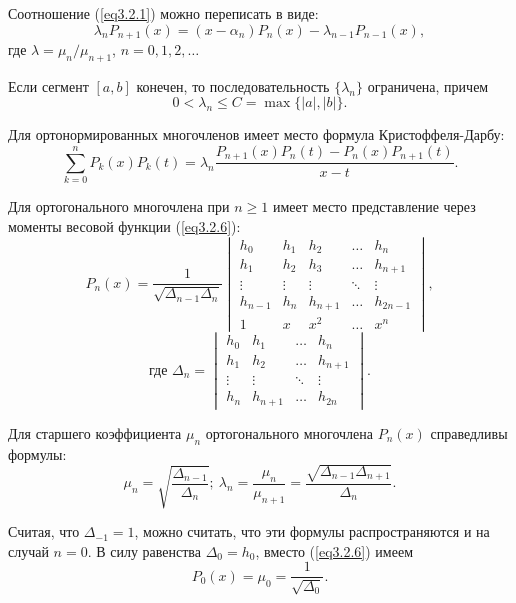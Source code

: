 Соотношение (\ref{eq3.2.1}) можно переписать в виде:
\[
    \lambda_nP_{n+1}(x) = (x-\alpha_n)P_n(x) - \lambda_{n-1}P_{n-1}(x),
\]
где \( \lambda = \mu_n/\mu_{n+1} \), \( n = 0, 1, 2, \ldots \)

\begin{lemma}
    Если сегмент \( [a, b] \) конечен, то последовательность
    \( \{ \lambda_n \} \) ограничена, причем
    \[
        0 < \lambda_n \le C = \max\{ |a|, |b| \}.
    \]
\end{lemma}

\begin{theorem}
    Для ортонормированных многочленов имеет место формула Кристоффеля-Дарбу:
    \begin{equation}
        \sum\limits_{k=0}^n P_k(x)P_k(t) =
        \lambda_n\frac{P_{n+1}(x)P_n(t) - P_n(x)P_{n+1}(t)}{x-t}.
        \label{eq3.2.5}
    \end{equation}
\end{theorem}

\begin{theorem}
    Для ортогонального многочлена при \( n \ge 1 \) имеет место представление
    через моменты весовой функции (\ref{eq3.2.6}):
    \begin{equation}
        P_n(x) = \frac{1}{\sqrt{\Delta_{n-1}\Delta_n}}
        \begin{vmatrix}
        h_0 & h_1 & h_2 & \ldots & h_n \\
        h_1 & h_2 & h_3 & \ldots & h_{n+1} \\
        \vdots & \vdots & \vdots & \ddots & \vdots \\
        h_{n-1} & h_n & h_{n+1} & \ldots & h_{2n-1} \\
        1 & x & x^2 & \ldots & x^n
        \end{vmatrix},
        \label{eq3.2.6}
    \end{equation}
    \[
        \text{где } \Delta_n =
        \begin{vmatrix}
            h_0 & h_1 & \ldots & h_n \\
            h_1 & h_2 & \ldots & h_{n+1} \\
            \vdots & \vdots & \ddots & \vdots \\
            h_n & h_{n+1} & \ldots & h_{2n}
        \end{vmatrix}.
    \]
    
    Для старшего коэффициента \( \mu_n \) ортогонального многочлена \( P_n(x) \)
    справедливы формулы:
    \[
        \mu_n = \sqrt{\frac{\Delta_{n-1}}{\Delta_n}};\ 
        \lambda_n = \frac{\mu_n}{\mu_{n+1}} =
        \frac{\sqrt{\Delta_{n-1}\Delta_{n+1}}}{\Delta_n}.
    \]
    
    Считая, что \( \Delta_{-1} = 1 \), можно считать, что эти формулы
    распространяются и на случай \( n = 0 \). В силу равенства
    \( \Delta_0 = h_0 \), вместо (\ref{eq3.2.6}) имеем
    \[
        P_0(x) = \mu_0 = \frac{1}{\sqrt{\Delta_0}}.
    \]
\end{theorem}

